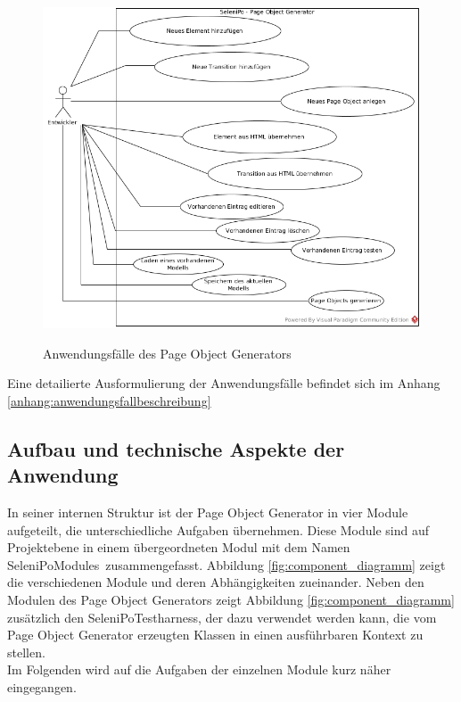 \begin{figure}[htb]
  \centering  
  \includegraphics[scale=0.45]{img/Use-Cases.jpg}\\
  \caption{Anwendungsfälle des Page Object Generators}
  \label{fig:use_case}
\end{figure}

Eine detailierte Ausformulierung der Anwendungsfälle befindet sich im Anhang \ref{anhang:anwendungsfallbeschreibung}

\newpage

\subsection{Aufbau und technische Aspekte der Anwendung}
\label{sec:aufbau_des_systems}
In seiner internen Struktur ist der Page Object Generator in vier Module aufgeteilt, die unterschiedliche Aufgaben übernehmen. Diese Module sind auf Projektebene in einem übergeordneten Modul mit dem Namen \grq SeleniPoModules\grq\ zusammengefasst. Abbildung \ref{fig:component_diagramm} zeigt die verschiedenen Module und deren Abhängigkeiten zueinander.
Neben den Modulen des Page Object Generators zeigt Abbildung \ref{fig:component_diagramm} zusätzlich den SeleniPoTestharness, der dazu verwendet werden kann, die vom Page Object Generator erzeugten Klassen in einen ausführbaren Kontext zu stellen.\\
Im Folgenden wird auf die Aufgaben der einzelnen Module kurz näher eingegangen.

